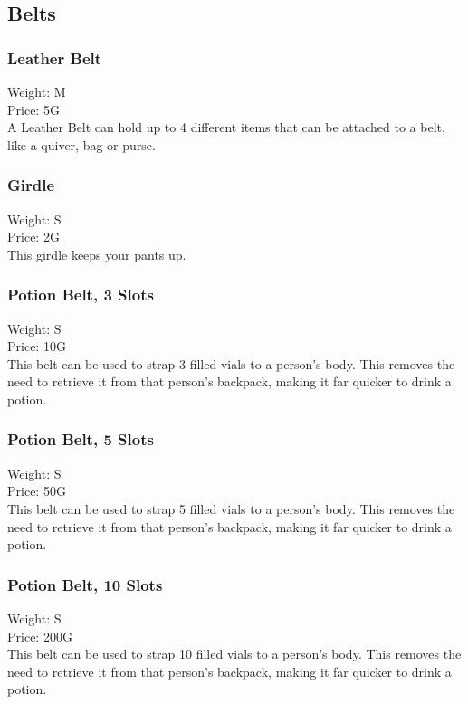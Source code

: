 \subsection{Belts}\label{subsec:belts}

\subsubsection{Leather Belt}\label{item:leatherbelt}
Weight: M\\
Price: 5G\\
A Leather Belt can hold up to 4 different items that can be attached to a belt, like a quiver, bag or purse.

\subsubsection{Girdle}\label{item:girdle}
Weight: S\\
Price: 2G\\
This girdle keeps your pants up.

\subsubsection{Potion Belt, 3 Slots}\label{item:potionBeltThreeItems}
Weight: S\\
Price: 10G\\
This belt can be used to strap 3 filled vials to a person's body.
This removes the need to retrieve it from that person's backpack, making it far quicker to drink a potion.

\subsubsection{Potion Belt, 5 Slots}\label{item:potionBeltFiveItems}
Weight: S\\
Price: 50G\\
This belt can be used to strap 5 filled vials to a person's body.
This removes the need to retrieve it from that person's backpack, making it far quicker to drink a potion.

\subsubsection{Potion Belt, 10 Slots}\label{item:potionBelt10Items}
Weight: S\\
Price: 200G\\
This belt can be used to strap 10 filled vials to a person's body.
This removes the need to retrieve it from that person's backpack, making it far quicker to drink a potion.



